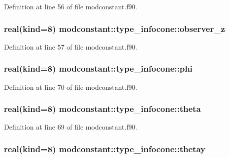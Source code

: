 Definition at line 56 of file modconstant.\-f90.

\hypertarget{structmodconstant_1_1type__infocone_a05bd00def00e396390e75c97d9e171b8}{
\subsubsection[{observer\-\_\-z}]{\setlength{\rightskip}{0pt plus 5cm}real(kind=8) modconstant\-::type\-\_\-infocone\-::observer\-\_\-z}}\label{structmodconstant_1_1type__infocone_a05bd00def00e396390e75c97d9e171b8}


Definition at line 57 of file modconstant.\-f90.

\hypertarget{structmodconstant_1_1type__infocone_a6c6e23dca52286e64a2a61931448c936}{
\subsubsection[{phi}]{\setlength{\rightskip}{0pt plus 5cm}real(kind=8) modconstant\-::type\-\_\-infocone\-::phi}}\label{structmodconstant_1_1type__infocone_a6c6e23dca52286e64a2a61931448c936}


Definition at line 70 of file modconstant.\-f90.

\hypertarget{structmodconstant_1_1type__infocone_ae6f027ed75ab0345c80f6b106d8e98d8}{
\subsubsection[{theta}]{\setlength{\rightskip}{0pt plus 5cm}real(kind=8) modconstant\-::type\-\_\-infocone\-::theta}}\label{structmodconstant_1_1type__infocone_ae6f027ed75ab0345c80f6b106d8e98d8}


Definition at line 69 of file modconstant.\-f90.

\hypertarget{structmodconstant_1_1type__infocone_ab594a24866362a4d0948fd0eed397651}{
\subsubsection[{thetay}]{\setlength{\rightskip}{0pt plus 5cm}real(kind=8) modconstant\-::type\-\_\-infocone\-::thetay}}\label{structmodconstant_1_1type__infocone_ab594a24866362a4d0948fd0eed397651}


